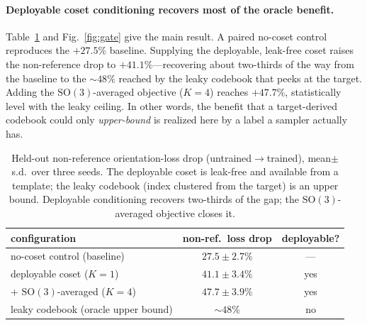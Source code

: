 \documentclass[10pt]{article}
\begin{document}
\paragraph{Deployable coset conditioning recovers most of the oracle benefit.}
\label{sec:gate}
Table~\ref{tab:gate} and Fig.~\ref{fig:gate} give the main result. A paired
no-coset control reproduces the $+27.5\%$ baseline. Supplying the deployable,
leak-free coset raises the non-reference drop to $+41.1\%$---recovering about
two-thirds of the way from the baseline to the $\sim\!48\%$ reached by the leaky
codebook that peeks at the target. Adding the $\mathrm{SO}(3)$-averaged objective
($K{=}4$) reaches $+47.7\%$, statistically level with the leaky ceiling. In other
words, the benefit that a target-derived codebook could only \emph{upper-bound}
is realized here by a label a sampler actually has.

\begin{table}[t]
\centering
\caption{Held-out non-reference orientation-loss drop (untrained$\to$trained),
mean$\pm$s.d.\ over three seeds. The deployable coset is leak-free and available
from a template; the leaky codebook (index clustered from the target) is an
upper bound. Deployable conditioning recovers two-thirds of the gap; the
$\mathrm{SO}(3)$-averaged objective closes it.}
\label{tab:gate}
\begin{tabular}{lcc}
\toprule
configuration & non-ref.\ loss drop & deployable? \\
\midrule
no-coset control (baseline)         & $27.5\pm2.7\%$ & --- \\
deployable coset ($K{=}1$)          & $41.1\pm3.4\%$ & yes \\
\quad + $\mathrm{SO}(3)$-averaged ($K{=}4$) & $47.7\pm3.9\%$ & yes \\
leaky codebook (oracle upper bound) & $\sim48\%$      & no  \\
\bottomrule
\end{tabular}
\end{table}
\end{document}
